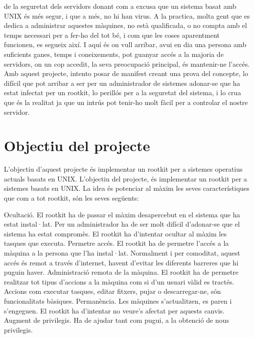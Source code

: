 \documentclass[a4paper]{article}
\begin{document}
de la seguretat dels servidors donant com a excusa que un sistema basat amb UNIX és
més segur, i que a més, no hi han virus. A la practica, molta gent que es dedica a
administrar aquestes màquines, no està qualificada, o no compta amb el temps necessari
per a fer-ho del tot bé, i com que les coses aparentment funcionen, es segueix així.
I aquí és on vull arribar, avui en dia una persona amb suficients ganes, temps i
coneixements, pot guanyar accés a la majoria de servidors, on un cop accedit, la seva
preocupació principal, és mantenir-ne l'accés.
Amb aquest projecte, intento posar de manifest creant una prova del concepte, lo difícil
que pot arribar a ser per un administrador de sistemes adonar-se que ha estat infectat per
un rootkit, lo perillós per a la seguretat del sistema, i lo crua que és la realitat ja que un
intrús pot tenir-ho molt fàcil per a controlar el nostre servidor.

\section{Objectiu del projecte}

L'objectiu d'aquest projecte és implementar un rootkit per a sistemes operatius actuals
basats en UNIX.
L'objectiu del projecte, és implementar un rootkit per a sistemes basats en UNIX. La idea
és potenciar al màxim les seves característiques que com a tot rootkit, són les seves
següents:

Ocultació. El rootkit ha de passar el màxim desapercebut en el sistema que ha
estat instal·lat. Per un administrador ha de ser molt difícil d'adonar-se que el
sistema ha estat compromès. El rootkit ha d'intentar ocultar al màxim les tasques
que executa.
Permetre accés. El rootkit ha de permetre l'accés a la màquina a la persona que
l'ha instal·lat. Normalment i per comoditat, aquest accés és remot a través
d'internet, havent d'evitar les diferents barreres que hi puguin haver.
Administració remota de la màquina. El rootkit ha de permetre realitzar tot tipus
d'accions a la màquina com si d'un usuari vàlid es tractés. Accions com executar
tasques, editar fitxers, pujar o descarregar-ne, són funcionalitats bàsiques.
Permanència. Les màquines s'actualitzen, es paren i s'engeguen. El rootkit ha
d'intentar no veure's afectat per aquests canvis.
Augment de privilegis. Ha de ajudar tant com pugui, a la obtenció de nous
privilegis.



%
\end{document}
